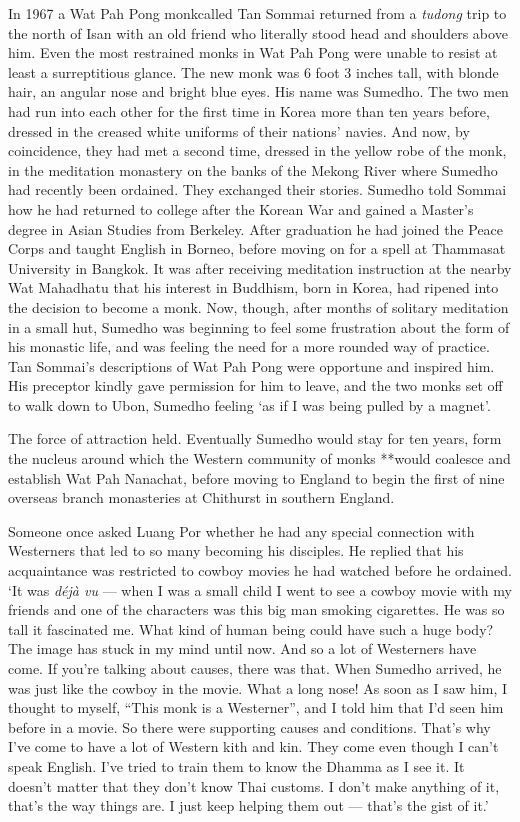 In 1967 a Wat Pah Pong monkcalled Tan Sommai returned from a
\emph{tudong} trip to the north of Isan with an old friend who literally
stood head and shoulders above him. Even the most restrained monks in
Wat Pah Pong were unable to resist at least a surreptitious glance. The
new monk was 6 foot 3 inches tall, with blonde hair, an angular nose and
bright blue eyes. His name was Sumedho. The two men had run into each
other for the first time in Korea more than ten years before, dressed in
the creased white uniforms of their nations' navies. And now, by
coincidence, they had met a second time, dressed in the yellow robe of
the monk, in the meditation monastery on the banks of the Mekong River
where Sumedho had recently been ordained. They exchanged their stories.
Sumedho told Sommai how he had returned to college after the Korean War
and gained a Master's degree in Asian Studies from Berkeley. After
graduation he had joined the Peace Corps and taught English in Borneo,
before moving on for a spell at Thammasat University in Bangkok. It was
after receiving meditation instruction at the nearby Wat Mahadhatu that
his interest in Buddhism, born in Korea, had ripened into the decision
to become a monk. Now, though, after months of solitary meditation in a
small hut, Sumedho was beginning to feel some frustration about the form
of his monastic life, and was feeling the need for a more rounded way of
practice. Tan Sommai's descriptions of Wat Pah Pong were opportune and
inspired him. His preceptor kindly gave permission for him to leave, and
the two monks set off to walk down to Ubon, Sumedho feeling `as if I was
being pulled by a magnet'.

The force of attraction held. Eventually Sumedho would stay for ten
years, form the nucleus around which the Western community of monks
**would coalesce and establish Wat Pah Nanachat, before moving to
England to begin the first of nine overseas branch monasteries at
Chithurst in southern England.

Someone once asked Luang Por whether he had any special connection with
Westerners that led to so many becoming his disciples. He replied that
his acquaintance was restricted to cowboy movies he had watched before
he ordained. `It was \emph{déjà vu} --- when I was a small child I went
to see a cowboy movie with my friends and one of the characters was this
big man smoking cigarettes. He was so tall it fascinated me. What kind
of human being could have such a huge body? The image has stuck in my
mind until now. And so a lot of Westerners have come. If you're talking
about causes, there was that. When Sumedho arrived, he was just like the
cowboy in the movie. What a long nose! As soon as I saw him, I thought
to myself, ``This monk is a Westerner'', and I told him that I'd seen
him before in a movie. So there were supporting causes and conditions.
That's why I've come to have a lot of Western kith and kin. They come
even though I can't speak English. I've tried to train them to know the
Dhamma as I see it. It doesn't matter that they don't know Thai customs.
I don't make anything of it, that's the way things are. I just keep
helping them out --- that's the gist of it.'

